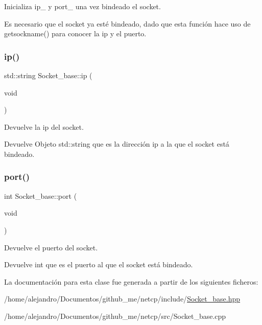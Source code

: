Inicializa ip\+\_\+ y port\+\_\+ una vez bindeado el socket. 

Es necesario que el socket ya esté bindeado, dado que esta función hace uso de getsockname() para conocer la ip y el puerto. \mbox{\label{classSocket__base_aed490170422026c6dfe5def12031cd04}} 
\subsubsection{\texorpdfstring{ip()}{ip()}}
{\footnotesize\ttfamily std\+::string Socket\+\_\+base\+::ip (\begin{DoxyParamCaption}\item[{void}]{ }\end{DoxyParamCaption})}



Devuelve la ip del socket. 

\begin{DoxyReturn}{Devuelve}
Objeto std\+::string que es la dirección ip a la que el socket está bindeado. 
\end{DoxyReturn}
\mbox{\label{classSocket__base_afcdd7ae81a9fb867d012b7db8c259576}} 
\subsubsection{\texorpdfstring{port()}{port()}}
{\footnotesize\ttfamily int Socket\+\_\+base\+::port (\begin{DoxyParamCaption}\item[{void}]{ }\end{DoxyParamCaption})}



Devuelve el puerto del socket. 

\begin{DoxyReturn}{Devuelve}
int que es el puerto al que el socket está bindeado. 
\end{DoxyReturn}


La documentación para esta clase fue generada a partir de los siguientes ficheros\+:\begin{DoxyCompactItemize}
\item 
/home/alejandro/\+Documentos/github\+\_\+me/netcp/include/\hyperlink{Socket__base_8hpp}{Socket\+\_\+base.\+hpp}\item 
/home/alejandro/\+Documentos/github\+\_\+me/netcp/src/Socket\+\_\+base.\+cpp\end{DoxyCompactItemize}
